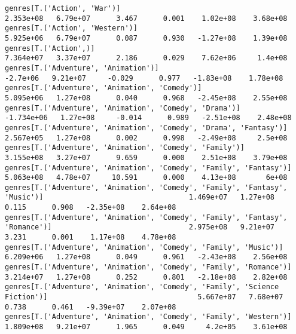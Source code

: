 \documentclass[11pt]{article}
\begin{document}
\begin{Verbatim}[commandchars=\\\{\}]
genres[T.('Action', 'War')]                                                                                   2.353e+08   6.79e+07      3.467      0.001    1.02e+08    3.68e+08
genres[T.('Action', 'Western')]                                                                               5.925e+06   6.79e+07      0.087      0.930   -1.27e+08    1.39e+08
genres[T.('Action',)]                                                                                         7.364e+07   3.37e+07      2.186      0.029    7.62e+06     1.4e+08
genres[T.('Adventure', 'Animation')]                                                                           -2.7e+06   9.21e+07     -0.029      0.977   -1.83e+08    1.78e+08
genres[T.('Adventure', 'Animation', 'Comedy')]                                                                5.095e+06   1.27e+08      0.040      0.968   -2.45e+08    2.55e+08
genres[T.('Adventure', 'Animation', 'Comedy', 'Drama')]                                                      -1.734e+06   1.27e+08     -0.014      0.989   -2.51e+08    2.48e+08
genres[T.('Adventure', 'Animation', 'Comedy', 'Drama', 'Fantasy')]                                            2.567e+05   1.27e+08      0.002      0.998   -2.49e+08     2.5e+08
genres[T.('Adventure', 'Animation', 'Comedy', 'Family')]                                                      3.155e+08   3.27e+07      9.659      0.000    2.51e+08    3.79e+08
genres[T.('Adventure', 'Animation', 'Comedy', 'Family', 'Fantasy')]                                           5.063e+08   4.78e+07     10.591      0.000    4.13e+08       6e+08
genres[T.('Adventure', 'Animation', 'Comedy', 'Family', 'Fantasy', 'Music')]                                  1.469e+07   1.27e+08      0.115      0.908   -2.35e+08    2.64e+08
genres[T.('Adventure', 'Animation', 'Comedy', 'Family', 'Fantasy', 'Romance')]                                2.975e+08   9.21e+07      3.231      0.001    1.17e+08    4.78e+08
genres[T.('Adventure', 'Animation', 'Comedy', 'Family', 'Music')]                                             6.209e+06   1.27e+08      0.049      0.961   -2.43e+08    2.56e+08
genres[T.('Adventure', 'Animation', 'Comedy', 'Family', 'Romance')]                                           3.214e+07   1.27e+08      0.252      0.801   -2.18e+08    2.82e+08
genres[T.('Adventure', 'Animation', 'Comedy', 'Family', 'Science Fiction')]                                   5.667e+07   7.68e+07      0.738      0.461   -9.39e+07    2.07e+08
genres[T.('Adventure', 'Animation', 'Comedy', 'Family', 'Western')]                                           1.809e+08   9.21e+07      1.965      0.049     4.2e+05    3.61e+08

\end{Verbatim}
\end{document}
